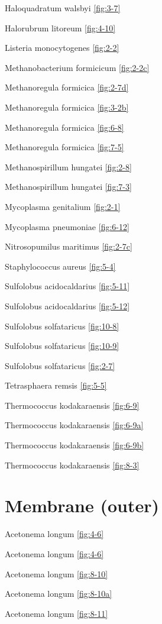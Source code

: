 \documentclass[]{tufte-book}
\begin{document}
Haloquadratum walsbyi \ref{fig:3-7}

Halorubrum litoreum \ref{fig:4-10}

Listeria monocytogenes \ref{fig:2-2}

Methanobacterium formicicum \ref{fig:2-2c}

Methanoregula formicica \ref{fig:2-7d}

Methanoregula formicica \ref{fig:3-2b}

Methanoregula formicica \ref{fig:6-8}

Methanoregula formicica \ref{fig:7-5}

Methanospirillum hungatei \ref{fig:2-8}

Methanospirillum hungatei \ref{fig:7-3}

Mycoplasma genitalium \ref{fig:2-1}

Mycoplasma pneumoniae \ref{fig:6-12}

Nitrosopumilus maritimus \ref{fig:2-7c}

Staphylococcus aureus \ref{fig:5-4}

Sulfolobus acidocaldarius \ref{fig:5-11}

Sulfolobus acidocaldarius \ref{fig:5-12}

Sulfolobus solfataricus \ref{fig:10-8}

Sulfolobus solfataricus \ref{fig:10-9}

Sulfolobus solfataricus \ref{fig:2-7}

Tetrasphaera remsis \ref{fig:5-5}

Thermococcus kodakaraensis \ref{fig:6-9}

Thermococcus kodakaraensis \ref{fig:6-9a}

Thermococcus kodakaraensis \ref{fig:6-9b}

Thermococcus kodakaraensis \ref{fig:8-3}

\hypertarget{membrane-outer}{%
\section*{Membrane (outer)}\label{membrane-outer}}

Acetonema longum \ref{fig:4-6}

Acetonema longum \ref{fig:4-6}

Acetonema longum \ref{fig:8-10}

Acetonema longum \ref{fig:8-10a}

Acetonema longum \ref{fig:8-11}
\end{document}
